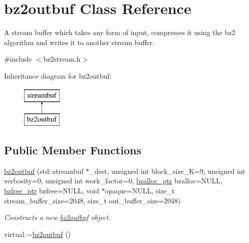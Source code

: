 \hypertarget{classbz2outbuf}{}\section{bz2outbuf Class Reference}
\label{classbz2outbuf}


A stream buffer which takes any form of input, compresses it using the bz2 algorithm and writes it to another stream buffer.  




{\ttfamily \#include $<$bz2stream.\+h$>$}

Inheritance diagram for bz2outbuf\+:\begin{figure}[H]
\begin{center}
\leavevmode
\includegraphics[height=2.000000cm]{classbz2outbuf}
\end{center}
\end{figure}
\subsection*{Public Member Functions}
\begin{DoxyCompactItemize}
\item 
\hyperlink{classbz2outbuf_ad907143431be210070e941c963df0f14}{bz2outbuf} (std\+::streambuf $\ast$\+\_\+dest, unsigned int block\+\_\+size\+\_\+K=9, unsigned int verbosity=0, unsigned int work\+\_\+factor=0, \hyperlink{bz2stream_8h_ad84a886ecf0c0c00445cdd219beb6a7b}{bzalloc\+\_\+ptr} bzalloc=N\+U\+L\+L, \hyperlink{bz2stream_8h_a3ae1e0ffde629a32e954abecc8cd7bb2}{bzfree\+\_\+ptr} bzfree=N\+U\+L\+L, void $\ast$opaque=N\+U\+L\+L, size\+\_\+t stream\+\_\+buffer\+\_\+size=2048, size\+\_\+t out\+\_\+buffer\+\_\+size=2048)
\begin{DoxyCompactList}\small\item\em Constructs a new \hyperlink{classbz2outbuf}{bz2outbuf} object. \end{DoxyCompactList}\item 
virtual \hyperlink{classbz2outbuf_a79ea8efd07c7e4a80c85e00e178e94bf}{$\sim$bz2outbuf} ()
\end{DoxyCompactItemize}

